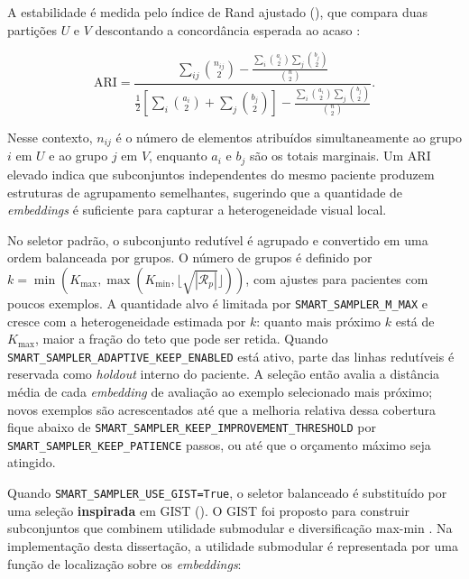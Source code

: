 A estabilidade é medida pelo índice de Rand ajustado
(), que compara duas partições $U$ e
$V$ descontando a concordância esperada ao acaso \cite{hubert1985comparing}:

\begin{equation}
    \mathrm{ARI} =
    \frac{
    \sum_{ij}\binom{n_{ij}}{2}
    -
    \frac{\sum_i\binom{a_i}{2}\sum_j\binom{b_j}{2}}{\binom{n}{2}}
    }{
    \frac{1}{2}\left[
    \sum_i\binom{a_i}{2}+\sum_j\binom{b_j}{2}
    \right]
    -
    \frac{\sum_i\binom{a_i}{2}\sum_j\binom{b_j}{2}}{\binom{n}{2}}
    } .
    \label{eq:ari}
\end{equation}

Nesse contexto, $n_{ij}$ é o número de elementos atribuídos simultaneamente ao
grupo $i$ em $U$ e ao grupo $j$ em $V$, enquanto $a_i$ e $b_j$ são os totais
marginais. Um ARI elevado indica que subconjuntos independentes do mesmo
paciente produzem estruturas de agrupamento semelhantes, sugerindo que a quantidade de \textit{embeddings} é suficiente para capturar a heterogeneidade visual
local.

No seletor padrão, o subconjunto redutível é agrupado e convertido em uma ordem
balanceada por grupos. O número de grupos é definido por
$k=\min(K_{\max},\max(K_{\min},\lfloor\sqrt{|\mathcal{R}_p|}\rfloor))$, com
ajustes para pacientes com poucos exemplos. A quantidade alvo é limitada por
\texttt{SMART\_SAMPLER\_M\_MAX} e cresce com a heterogeneidade estimada por
$k$: quanto mais próximo $k$ está de $K_{\max}$, maior a fração do teto que pode
ser retida. Quando \texttt{SMART\_SAMPLER\_ADAPTIVE\_KEEP\_ENABLED} está ativo,
parte das linhas redutíveis é reservada como \textit{holdout} interno do
paciente. A seleção então avalia a distância média de cada \textit{embedding} de
avaliação ao exemplo selecionado mais próximo; novos exemplos são acrescentados
até que a melhoria relativa dessa cobertura fique abaixo de
\texttt{SMART\_SAMPLER\_KEEP\_IMPROVEMENT\_THRESHOLD} por
\texttt{SMART\_SAMPLER\_KEEP\_PATIENCE} passos, ou até que o orçamento máximo
seja atingido.

Quando \texttt{SMART\_SAMPLER\_USE\_GIST=True}, o seletor balanceado é
substituído por uma seleção \textbf{inspirada} em GIST
(). O GIST foi
proposto para construir subconjuntos que combinem utilidade submodular e
diversificação max-min \cite{fahrbach2025gist}. Na implementação desta
dissertação, a utilidade submodular é representada por uma função de localização
sobre os \textit{embeddings}:

